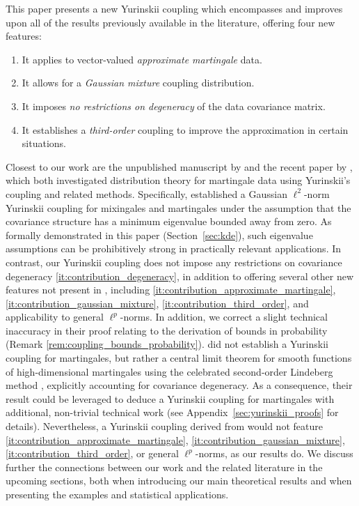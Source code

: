 This paper presents a new Yurinskii coupling which encompasses and
improves upon all of the results previously available in the
literature, offering four new features:
%
\begin{enumerate}[label=(\roman*),leftmargin=*]
  \item
    \label{it:contribution_approximate_martingale}
    It applies to vector-valued
    \textit{approximate martingale} data.
  \item
    \label{it:contribution_gaussian_mixture}
    It allows for a \textit{Gaussian mixture} coupling distribution.
  \item
    \label{it:contribution_degeneracy}
    It imposes \textit{no restrictions on degeneracy} of the
    data covariance matrix.
  \item
    \label{it:contribution_third_order}
    It establishes a \textit{third-order} coupling to
    improve the approximation in certain situations.
\end{enumerate}
%

Closest to our work are the unpublished manuscript by
\citet{belloni2018high} and the recent paper by
\citet{li2020uniform},
which both investigated distribution theory for martingale
data using Yurinskii's coupling and related methods. Specifically,
\citet{li2020uniform}
established a Gaussian $\ell^2$-norm Yurinskii coupling for
mixingales and martingales under the assumption that the covariance structure
has a minimum eigenvalue bounded away from zero. As formally demonstrated in
this paper (Section~\ref{sec:kde}), such eigenvalue assumptions can be
prohibitively strong in practically relevant applications. In contrast, our
Yurinskii coupling does not impose any restrictions on covariance degeneracy
\ref{it:contribution_degeneracy}, in addition to offering several other new
features not present in \citet{li2020uniform}, including
\ref{it:contribution_approximate_martingale},
\ref{it:contribution_gaussian_mixture}, \ref{it:contribution_third_order}, and
applicability to general $\ell^p$-norms. In addition, we correct a slight
technical inaccuracy in their proof relating to the derivation of bounds in
probability (Remark \ref{rem:coupling_bounds_probability}).
\citet{belloni2018high} did not establish a Yurinskii coupling for
martingales, but rather a central limit theorem for smooth functions
of high-dimensional martingales
using the celebrated second-order Lindeberg method
\citep[see][and references therein]{chatterjee2006generalization},
explicitly accounting for covariance
degeneracy. As a consequence, their result could be leveraged to deduce a
Yurinskii coupling for martingales with additional, non-trivial technical work
(see Appendix~\ref{sec:yurinskii_proofs}
for details). Nevertheless, a
Yurinskii coupling derived from \citet{belloni2018high} would not feature
\ref{it:contribution_approximate_martingale},
\ref{it:contribution_gaussian_mixture}, \ref{it:contribution_third_order}, or
general $\ell^p$-norms, as our results do. We discuss
further the connections between our work and the related literature in the
upcoming sections, both when introducing our main theoretical results and when
presenting the examples and statistical applications.

